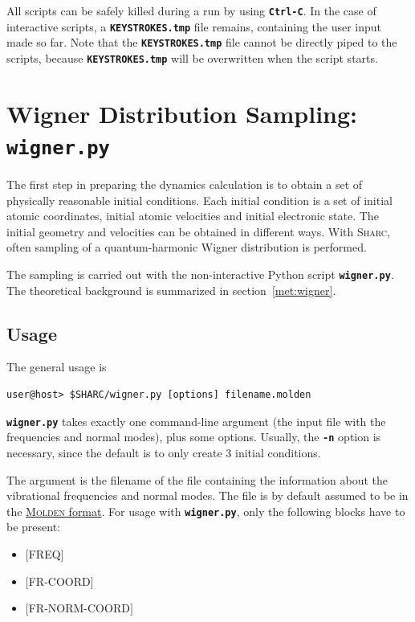 \documentclass[a4paper,10pt,DIV=15,openany]{scrbook}
\newcommand{\link}[2]{\href{#1}{#2}}
\newcommand{\sharc}{\textsc{Sharc}}
\newcommand{\ttt}[1]{\textbf{\texttt{#1}}}
\begin{document}
All scripts can be safely killed during a run by using \ttt{Ctrl-C}. In the case of interactive scripts, a \ttt{KEYSTROKES.tmp} file remains, containing the user input made so far. Note that the \ttt{KEYSTROKES.tmp} file cannot be directly piped to the scripts, because \ttt{KEYSTROKES.tmp} will be overwritten when the script starts.




\section{Wigner Distribution Sampling: \ttt{wigner.py}}\label{sec:wigner.py}

The first step in preparing the dynamics calculation is to obtain a set of physically reasonable initial conditions. Each initial condition is a set of initial atomic coordinates, initial atomic velocities and initial electronic state. The initial geometry and velocities can be obtained in different ways. With \sharc, often sampling of a quantum-harmonic Wigner distribution is performed. 

The sampling is carried out with the non-interactive Python script \ttt{wigner.py}. The theoretical background is summarized in section~\ref{met:wigner}.

\subsection{Usage}

The general usage is 
\begin{verbatim}
user@host> $SHARC/wigner.py [options] filename.molden
\end{verbatim}
\ttt{wigner.py} takes exactly one command-line argument (the input file with the frequencies and normal modes), plus some options. Usually, the \ttt{-n} option is necessary, since the default is to only create 3 initial conditions.

The argument is the filename of the file containing the information about the vibrational frequencies and normal modes. The file is by default assumed to be in the \link{http://www.cmbi.ru.nl/molden/molden_format.html}{\textsc{Molden} format}. For usage with \ttt{wigner.py}, only the following blocks have to be present:

\begin{minipage}{0.9\textwidth}
  \begin{itemize}
    \item $[$FREQ$]$
    \item $[$FR-COORD$]$
    \item $[$FR-NORM-COORD$]$
  \end{itemize}
\end{minipage}
\end{document}
